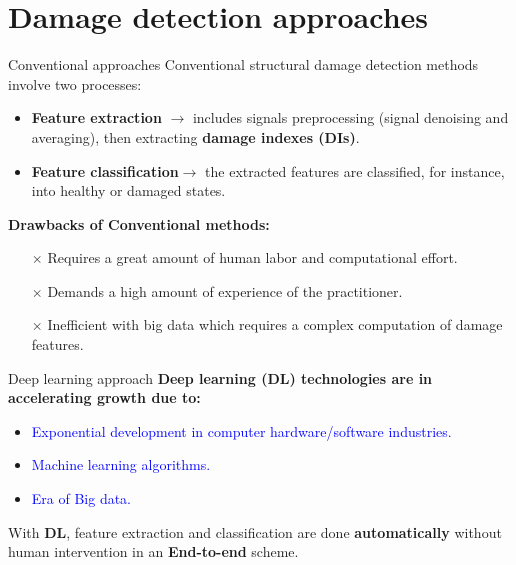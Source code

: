 \documentclass[10pt,aspectratio=169,dvipsnames]{beamer} %
\begin{document}
\section{Damage detection approaches}
\begin{frame}{Conventional approaches}
	Conventional structural damage detection methods involve two processes:
	\begin{itemize}
		\item \alert{\textbf{Feature extraction}} \(\rightarrow\) includes signals preprocessing (signal denoising and averaging), then extracting \textbf{damage indexes (DIs)}.
		\item \alert{\textbf{Feature classification}}\(\rightarrow\) the extracted features are classified, for instance, into healthy or damaged states.
	\end{itemize}
	\begin{figure}
	\end{figure}	
	\textbf{Drawbacks of Conventional methods:}
	\begin{itemize}
		\item[$\times$]\alert{Requires a great amount of human labor and computational effort.}
		\item[$\times$]\alert{Demands a high amount of experience of the practitioner.}
		\item[$\times$]\alert{Inefficient with big data which requires a complex computation of damage features.} 
		\end{itemize}
\end{frame}

\begin{frame}{Deep learning approach}
	\textbf{Deep learning (DL) technologies are in accelerating growth due to:}
	\begin{itemize}
			\item \textcolor{blue}{Exponential development in computer hardware/software industries.}
			\item \textcolor{blue}{Machine learning algorithms.}
			\item \textcolor{blue}{Era of Big data.}
	\end{itemize}	
	With \textbf{DL}, feature extraction and classification are done \alert{\textbf{automatically}} without human intervention in an \alert{\textbf{End-to-end}} scheme.
	\par\medskip
	\begin{figure}
	\end{figure}	
\end{frame}
\end{document}
